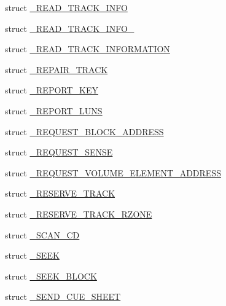 \begin{DoxyCompactItemize}
\item 
struct \hyperlink{struct___c_d_b_1_1___r_e_a_d___t_r_a_c_k___i_n_f_o}{\+\_\+\+R\+E\+A\+D\+\_\+\+T\+R\+A\+C\+K\+\_\+\+I\+N\+FO}
\item 
struct \hyperlink{struct___c_d_b_1_1___r_e_a_d___t_r_a_c_k___i_n_f_o__3}{\+\_\+\+R\+E\+A\+D\+\_\+\+T\+R\+A\+C\+K\+\_\+\+I\+N\+F\+O\+\_}
\item 
struct \hyperlink{struct___c_d_b_1_1___r_e_a_d___t_r_a_c_k___i_n_f_o_r_m_a_t_i_o_n}{\+\_\+\+R\+E\+A\+D\+\_\+\+T\+R\+A\+C\+K\+\_\+\+I\+N\+F\+O\+R\+M\+A\+T\+I\+ON}
\item 
struct \hyperlink{struct___c_d_b_1_1___r_e_p_a_i_r___t_r_a_c_k}{\+\_\+\+R\+E\+P\+A\+I\+R\+\_\+\+T\+R\+A\+CK}
\item 
struct \hyperlink{struct___c_d_b_1_1___r_e_p_o_r_t___k_e_y}{\+\_\+\+R\+E\+P\+O\+R\+T\+\_\+\+K\+EY}
\item 
struct \hyperlink{struct___c_d_b_1_1___r_e_p_o_r_t___l_u_n_s}{\+\_\+\+R\+E\+P\+O\+R\+T\+\_\+\+L\+U\+NS}
\item 
struct \hyperlink{struct___c_d_b_1_1___r_e_q_u_e_s_t___b_l_o_c_k___a_d_d_r_e_s_s}{\+\_\+\+R\+E\+Q\+U\+E\+S\+T\+\_\+\+B\+L\+O\+C\+K\+\_\+\+A\+D\+D\+R\+E\+SS}
\item 
struct \hyperlink{struct___c_d_b_1_1___r_e_q_u_e_s_t___s_e_n_s_e}{\+\_\+\+R\+E\+Q\+U\+E\+S\+T\+\_\+\+S\+E\+N\+SE}
\item 
struct \hyperlink{struct___c_d_b_1_1___r_e_q_u_e_s_t___v_o_l_u_m_e___e_l_e_m_e_n_t___a_d_d_r_e_s_s}{\+\_\+\+R\+E\+Q\+U\+E\+S\+T\+\_\+\+V\+O\+L\+U\+M\+E\+\_\+\+E\+L\+E\+M\+E\+N\+T\+\_\+\+A\+D\+D\+R\+E\+SS}
\item 
struct \hyperlink{struct___c_d_b_1_1___r_e_s_e_r_v_e___t_r_a_c_k}{\+\_\+\+R\+E\+S\+E\+R\+V\+E\+\_\+\+T\+R\+A\+CK}
\item 
struct \hyperlink{struct___c_d_b_1_1___r_e_s_e_r_v_e___t_r_a_c_k___r_z_o_n_e}{\+\_\+\+R\+E\+S\+E\+R\+V\+E\+\_\+\+T\+R\+A\+C\+K\+\_\+\+R\+Z\+O\+NE}
\item 
struct \hyperlink{struct___c_d_b_1_1___s_c_a_n___c_d}{\+\_\+\+S\+C\+A\+N\+\_\+\+CD}
\item 
struct \hyperlink{struct___c_d_b_1_1___s_e_e_k}{\+\_\+\+S\+E\+EK}
\item 
struct \hyperlink{struct___c_d_b_1_1___s_e_e_k___b_l_o_c_k}{\+\_\+\+S\+E\+E\+K\+\_\+\+B\+L\+O\+CK}
\item 
struct \hyperlink{struct___c_d_b_1_1___s_e_n_d___c_u_e___s_h_e_e_t}{\+\_\+\+S\+E\+N\+D\+\_\+\+C\+U\+E\+\_\+\+S\+H\+E\+ET}
\item 

\end{DoxyCompactItemize}
